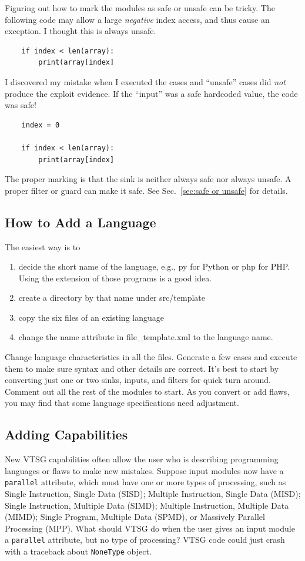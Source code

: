 \documentclass[12pt]{article}
\begin{document}
Figuring out how to mark the modules as safe or unsafe can be tricky.
The following code may allow a large \emph{negative} index access, and thus cause an
exception.  I thought this is always unsafe.
\begin{verbatim}
    if index < len(array):
        print(array[index]
\end{verbatim}
I discovered my mistake when I executed the cases and ``unsafe'' cases did
\emph{not} produce the exploit evidence.  If the ``input'' was a safe hardcoded
value, the code was safe!
\begin{verbatim}
    index = 0

    if index < len(array):
        print(array[index]
\end{verbatim}
The proper marking is that the sink is neither always safe nor always unsafe.
A proper filter or guard can make it safe.
See Sec.~\ref{sec:safe or unsafe} for details.


\subsection{How to Add a Language}

The easiest way is to
\begin{enumerate}[nosep]
\item decide the short name of the language, e.g., py for Python or php for
  PHP.  Using the extension of those programs is a good idea.
\item create a directory by that name under src/template
\item copy the six files of an existing language
\item change the name attribute in file\_template.xml to the language name.
\end{enumerate}
Change language characteristics in all the files.  Generate a few cases and
execute them to make sure syntax and other details are correct.  It's best to
start by converting just one or two sinks, inputs, and filters for quick turn around.
Comment out all the rest of the modules to start.
As you convert or add flaws, you may find that some language specifications need
adjustment.


\subsection{Adding Capabilities}

New VTSG capabilities often allow the user who is describing programming languages or
flaws to make new mistakes.  Suppose input modules now have a \verb|parallel|
attribute, which must have one or more types of processing, such as Single
Instruction, Single Data (SISD); Multiple Instruction, Single Data (MISD); Single
Instruction, Multiple Data (SIMD); Multiple Instruction, Multiple Data (MIMD); Single
Program, Multiple Data (SPMD), or Massively Parallel Processing (MPP).  What should
VTSG do when the user gives an input module a \verb|parallel| attribute, but no type
of processing?  VTSG code could just crash with a traceback about \verb|NoneType|
object.
\end{document}
